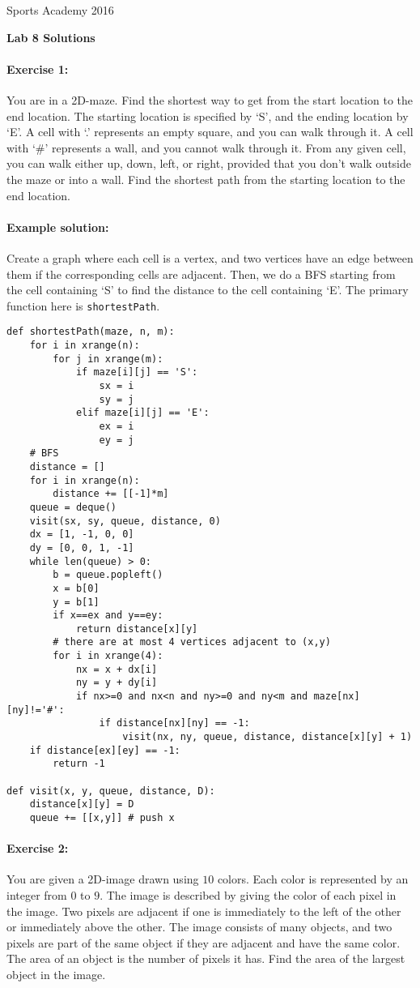 \documentclass[11pt]{article}
\newlength{\toppush}
\newcommand{\htitle}[2]{\noindent\vspace*{-\toppush}\newline\parbox{6.5in}
 {\large Sports Academy \hfill #1\newline
\hspace*{\fill}{\bf Algorithms and Programming for High Schoolers} \hspace*{\fill} \newline
\mbox{}\hrulefill\mbox{}}\vspace*{1ex}\mbox{}\newline
\begin{center}{\Large\bf #2}\end{center}}
\begin{document}
\htitle{2016}{Lab 8 Solutions}

\paragraph{Exercise 1:}
You are in a 2D-maze.  Find the shortest way to get from the start
location to the end location.  The starting location is specified by
`S', and the ending location by `E'.  A cell with `.' represents an
empty square, and you can walk through it.  A cell with `\#'
represents a wall, and you cannot walk through it.  From any given
cell, you can walk either up, down, left, or right, provided that you
don't walk outside the maze or into a wall.  Find the shortest path
from the starting location to the end location.

\paragraph{Example solution:}
Create a graph where each cell is a vertex, and two
vertices have an edge between them if the corresponding cells are
adjacent. Then, we do a BFS starting from the cell containing `S' to
find the distance to the cell containing `E'. The primary function here is \texttt{shortestPath}.

\begin{verbatim}
def shortestPath(maze, n, m):
    for i in xrange(n):
        for j in xrange(m):
            if maze[i][j] == 'S':
                sx = i
                sy = j
            elif maze[i][j] == 'E':
                ex = i
                ey = j
    # BFS
    distance = []
    for i in xrange(n):
        distance += [[-1]*m]
    queue = deque()
    visit(sx, sy, queue, distance, 0)
    dx = [1, -1, 0, 0]
    dy = [0, 0, 1, -1]
    while len(queue) > 0:
        b = queue.popleft()
        x = b[0]
        y = b[1]
        if x==ex and y==ey:
            return distance[x][y]
        # there are at most 4 vertices adjacent to (x,y)
        for i in xrange(4):
            nx = x + dx[i]
            ny = y + dy[i]
            if nx>=0 and nx<n and ny>=0 and ny<m and maze[nx][ny]!='#':
                if distance[nx][ny] == -1:
                    visit(nx, ny, queue, distance, distance[x][y] + 1)
    if distance[ex][ey] == -1:
        return -1

def visit(x, y, queue, distance, D):
    distance[x][y] = D
    queue += [[x,y]] # push x
\end{verbatim}

\paragraph{Exercise 2:}
You are given a 2D-image drawn using $10$ colors.  Each color is
represented by an integer from $0$ to $9$.  The image is described by
giving the color of each pixel in the image.  Two pixels are adjacent
if one is immediately to the left of the other or immediately above
the other.  The image consists of many objects, and two pixels are
part of the same object if they are adjacent and have the same color.
The area of an object is the number of pixels it has.  Find the area
of the largest object in the image.
\end{document}
